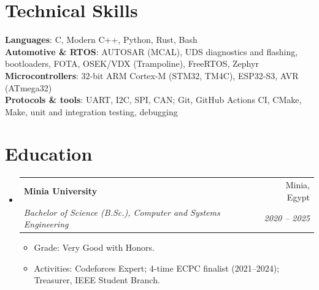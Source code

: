 \documentclass[letterpaper,11pt]{article}
\makeatletter
\newcommand{\resumeItem}[1]{
  \item\small{
    {#1 \vspace{-2pt}}
  }
}
\newcommand{\resumeSubheading}[4]{
  \vspace{-2pt}\item
    \begin{tabular*}{0.97\textwidth}[t]{l@{\extracolsep{\fill}}r}
      \textbf{#1} & #2 \\
      \textit{\small#3} & \textit{\small #4} \\
    \end{tabular*}\vspace{-7pt}
}
\newcommand{\resumeSubHeadingListStart}{\begin{itemize}[leftmargin=0.15in, label={}]}
\newcommand{\resumeSubHeadingListEnd}{\end{itemize}}
\newcommand{\resumeItemListStart}{\begin{itemize}}
\newcommand{\resumeItemListEnd}{\end{itemize}\vspace{-5pt}}
\makeatother
\begin{document}
%
\section{Technical Skills}
 \begin{itemize}[leftmargin=0.15in, label={}]
    \small{\item{
     \textbf{Languages}{: C, Modern C++, Python, Rust, Bash} \\
     \textbf{Automotive \& RTOS}{: AUTOSAR (MCAL), UDS diagnostics and flashing, bootloaders, FOTA, OSEK/VDX (Trampoline), FreeRTOS, Zephyr} \\
     \textbf{Microcontrollers}{: 32-bit ARM Cortex-M (STM32, TM4C), ESP32-S3, AVR (ATmega32)} \\
     \textbf{Protocols \& tools}{: UART, I2C, SPI, CAN; Git, GitHub Actions CI, CMake, Make, unit and integration testing, debugging}
    }}
 \end{itemize}

\section{Education}
  \resumeSubHeadingListStart
    \resumeSubheading
      {Minia University}{Minia, Egypt}
      {Bachelor of Science (B.Sc.), Computer and Systems Engineering}{2020 -- 2025}
      \resumeItemListStart
        \resumeItem{Grade: Very Good with Honors.}
        \resumeItem{Activities: Codeforces Expert; 4-time ECPC finalist (2021--2024); Treasurer, IEEE Student Branch.}
      \resumeItemListEnd
  \resumeSubHeadingListEnd


\end{document}
